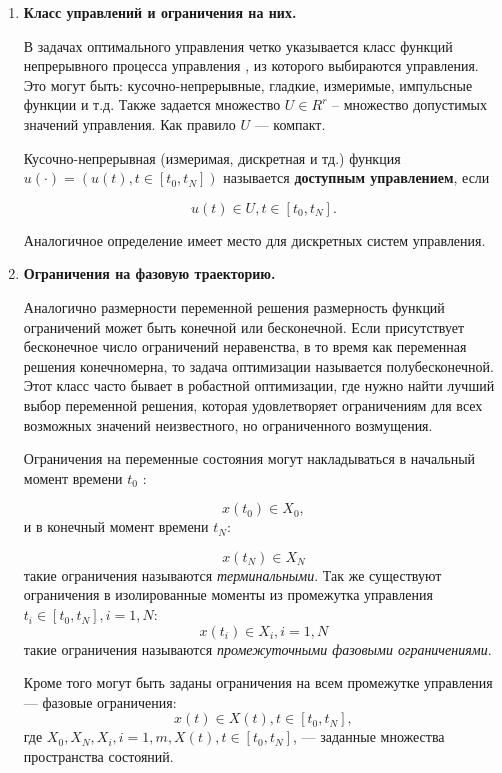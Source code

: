 \begin{enumerate}
    \item \textbf{Класс управлений и ограничения на них.}
    
    В задачах оптимального управления четко указывается класс функций  непрерывного процесса управления , из которого выбираются управления. Это могут быть: кусочно-непрерывные, гладкие, измеримые,  импульсные функции и т.д. Также задается множество $U \in R^r$ -- множество допустимых значений управления. Как правило $U$ — компакт.
    
    Кусочно-непрерывная (измеримая, дискретная и тд.) функция $u(·) = (u(t), t \in [t_0 , t_N ])$ называется \textbf{доступным управлением}, если 

\begin{equation} \label{eq_oc:diff}
	u(t) \in U, t \in [t_0 , t_N].
\end{equation}

Аналогичное определение имеет место для дискретных систем управления.


    \item \textbf{Ограничения на фазовую траекторию.}


Аналогично размерности переменной решения размерность функций ограничений может быть конечной или бесконечной. Если присутствует бесконечное число ограничений неравенства, в то время как переменная решения конечномерна, то задача оптимизации называется полубесконечной. Этот класс часто бывает в робастной оптимизации, где нужно найти лучший выбор переменной решения, которая удовлетворяет ограничениям для всех возможных значений неизвестного, но ограниченного возмущения.

 Ограничения на переменные состояния могут накладываться в начальный момент времени $t_0$ :

\begin{equation} \label{eq_oc:diff}
	x(t_0) \in X_0,
\end{equation}
и в конечный момент времени $t_N$:

\begin{equation} \label{eq_oc:diff}
	x(t_N) \in X_N
\end{equation}
такие ограничения называются \textit{терминальными}. Так же существуют ограничения в изолированные моменты из промежутка управления $t_i \in [t_0 , t_N], i = 1, N$:
$$x(t_i) \in X_i , i = 1, N$$
такие ограничения называются \textit{промежуточными фазовыми ограничениями}.

Кроме того могут быть заданы ограничения на всем промежутке управления — фазовые ограничения: $$x(t) \in X(t), t \in [t_0 , t_N ],$$
где $X_0 , X_N , X_i , i = 1, m, X(t), t \in [t_0 , t_N ]$, — заданные множества пространства состояний.


\end{enumerate}
